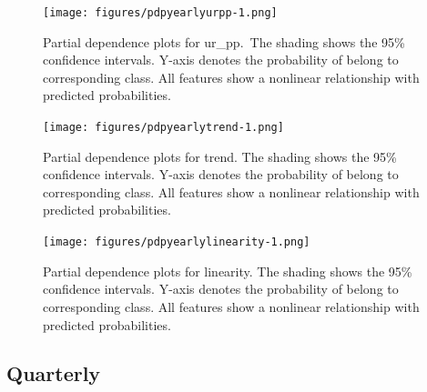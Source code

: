 \documentclass[11pt,a4paper,]{article}
\begin{document}
\newpage

\begin{figure}
\centering
\texttt{[image: figures/pdpyearlyurpp-1.png]}
\caption{\label{fig:pdpyearlyurpp}Partial dependence plots for ur\_pp.~The
shading shows the 95\% confidence intervals. Y-axis denotes the
probability of belong to corresponding class. All features show a
nonlinear relationship with predicted probabilities.}
\end{figure}

\begin{figure}
\centering
\texttt{[image: figures/pdpyearlytrend-1.png]}
\caption{\label{fig:pdpyearlytrend}Partial dependence plots for trend. The
shading shows the 95\% confidence intervals. Y-axis denotes the
probability of belong to corresponding class. All features show a
nonlinear relationship with predicted probabilities.}
\end{figure}

\begin{figure}
\centering
\texttt{[image: figures/pdpyearlylinearity-1.png]}
\caption{\label{fig:pdpyearlylinearity}Partial dependence plots for
linearity. The shading shows the 95\% confidence intervals. Y-axis
denotes the probability of belong to corresponding class. All features
show a nonlinear relationship with predicted probabilities.}
\end{figure}

\subsection{Quarterly}\label{quarterly}
\end{document}
